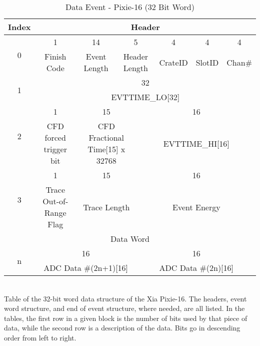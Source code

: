 \begin{landscape}
    \begin{table}[]
    \small
    \centering
    \caption{\label{tab:word_XIA}Data Event - Pixie-16 (32 Bit Word)}
    \begin{tabular}{c|c|c|c|c|c|c|c|c|c|c|c|c|c|c|c|c|c|c|c|c|c|c|c|c|c|c|c|c|c|c|c|c}
    \toprule
        Index & \multicolumn{32}{|c}{Header}\\
        \midrule
        \multirow{2}{*}{0} & 1 & \multicolumn{14}{|c|}{14} & \multicolumn{5}{|c|}{5} & \multicolumn{4}{|c|}{4} & \multicolumn{4}{|c|}{4} & \multicolumn{4}{|c}{4} \\
        \cline{2-33}
        & Finish Code & \multicolumn{14}{|c|}{Event Length} & \multicolumn{5}{|c|}{Header Length} & \multicolumn{4}{|c|}{CrateID} & \multicolumn{4}{|c|}{SlotID} & \multicolumn{4}{|c}{Chan\#} \\
        \midrule
        \multirow{2}{*}{1} & \multicolumn{32}{|c}{32} \\
        \cline{2-33}
        & \multicolumn{32}{|c}{EVTTIME\_LO[32]} \\
        \midrule
        \multirow{2}{*}{2} & 1 & \multicolumn{15}{|c|}{15} & \multicolumn{16}{|c}{16}\\
        \cline{2-33}
        & CFD forced trigger bit & \multicolumn{15}{|c|}{CFD Fractional Time[15] x 32768} & \multicolumn{16}{|c}{EVTTIME\_HI[16]} \\
        \midrule
        \multirow{2}{*}{3} & 1 & \multicolumn{15}{|c|}{15} & \multicolumn{16}{|c}{16}\\
        \cline{2-33}
        & Trace Out-of-Range Flag & \multicolumn{15}{|c|}{Trace Length} & \multicolumn{16}{|c}{Event Energy}\\
        \midrule
        \multicolumn{33}{c}{Data Word} \\
        \midrule
        \multirow{2}{*}{n} & \multicolumn{16}{|c|}{16} & \multicolumn{16}{|c}{16} \\
        \cline{2-33}
        & \multicolumn{16}{|c|}{ADC Data \#(2n+1)[16]} & \multicolumn{16}{|c}{ADC Data \#(2n)[16]} \\
        \bottomrule
    \end{tabular}
    \\[2pt]
    \footnotesize
    Table of the 32-bit word data structure of the Xia Pixie-16. The headers, event word structure, and end of event structure, where needed, are all listed. In the tables, the first row in a given block is the number of bits used by that piece of data, while the second row is a description of the data. Bits go in descending order from left to right.
\end{table}
\end{landscape}